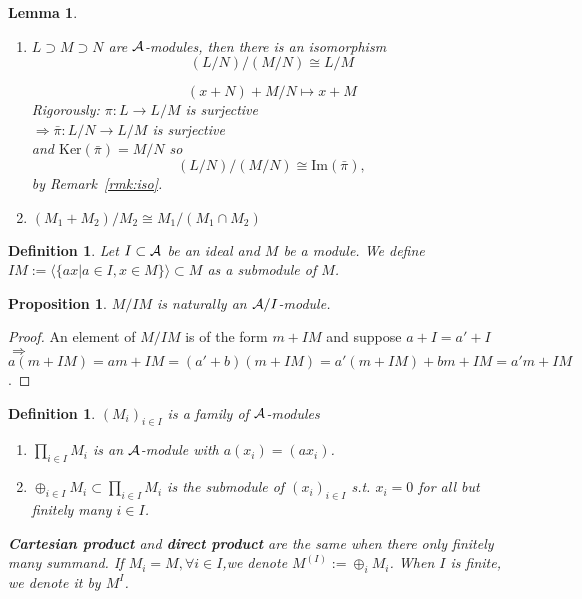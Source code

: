 \documentclass[11pt]{article}
\newtheorem{prop}[thm]{Proposition}
\newtheorem{lemma}[thm]{Lemma}
\newtheorem{dfn}[thm]{Definition}
\newcommand{\cala}{{\cal A}}
\newcommand{\rta}{\rightarrow}
\newcommand{\Lrta}{\Longrightarrow}
\newcommand{\lrta}{\longrightarrow}
\newcommand{\lgl}{\langle}
\newcommand{\rgl}{\rangle}
\begin{document}
\begin{lemma}\ 
\begin{enumerate}[label=(\roman*)]
    \item $L\supset M\supset N$ are $\cala$-modules, then there is an isomorphism 
    $$
        (L/N)/(M/N)\cong L/M
    $$

    $$
    (x+N)+M/N\mapsto x+M
    $$
    Rigorously:
    $\pi: L\lrta L/M$ is surjective\\
    $\Lrta \bar{\pi} :L/N\rta L/M$ is surjective\\
    and $\text{Ker}(\bar{\pi})=M/N$ so
     $$
     (L/N)/(M/N)\cong \text{Im}(\bar{\pi}),
     $$
     by Remark~\ref{rmk:iso}.
    \item $(M_1+M_2)/M_2\cong M_1/(M_1\cap M_2)$
\end{enumerate}
\end{lemma}
\begin{dfn}Let 
$I\subset \cala$ be an ideal and $M$ be a module. We define $I M:=\lgl \{ax|a\in I,x\in M\}\rgl\subset M$ as a submodule of $M$.
\end{dfn}
\begin{prop}
$M/IM$ is naturally an $\cala/I$-module.
\end{prop}
\begin{proof} 
An element of $M/IM$ is of the form $m+ IM$ and suppose $a+I =a'+I$ $\Lrta $ $ a(m+ IM)= am+ IM=(a'+ b)(m+IM)=a'(m+ IM)+ bm+ IM=a'm+IM$.
\end{proof}
\begin{dfn}
$(M_i)_{i \in I}$ is a family of $\cala$-modules
\begin{enumerate}[label=(\roman*)]
\item $\prod_{i\in I} M_i$ is an $\cala$-module with $a(x_i)=(a x_i)$.
\item $\oplus_{i\in I} M_i\subset \prod_{i\in I} M_i$ is the submodule of $(x_i)_{i\in I}$ s.t. $x_i=0$ for all but finitely many $i\in I$. 
\end{enumerate}
\textbf{Cartesian product} and \textbf{direct product} are the same when there only finitely many summand. If $M_i=M,\forall i\in I$,we denote $M^{(I)}:=\oplus_i M_i$. When $I$ is finite, we denote it by $M^I$.
\end{dfn}
\end{document}
